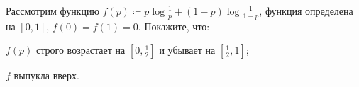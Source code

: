 Рассмотрим функцию $f(p) \coloneqq p \log \frac{1}{p} + (1 - p) \log \frac{1}{1 - p}$, функция определена
на $[0, 1]$, $f(0) = f(1) = 0$. Покажите, что:
\begin{enumcyr}
    \item $f(p)$ строго возрастает на $[0, \frac{1}{2}]$ и убывает на $[\frac{1}{2}, 1]$;
    \item $f$ выпукла вверх. 
\end{enumcyr}